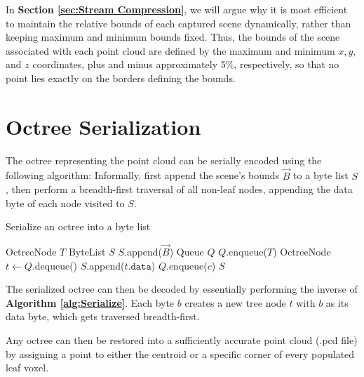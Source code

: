 \documentclass[twoside,twocolumn]{article}
\begin{document}
In \textbf{Section \ref{sec:Stream Compression}}, we will argue why it is most efficient to maintain the
relative bounds of each captured scene dynamically, rather than keeping maximum and minimum bounds fixed.
Thus, the bounds of the scene associated with each point cloud are defined by the maximum and minimum
$x, y,$ and $z$ coordinates, plus and minus approximately 5\%, respectively, so that no point lies
exactly on the borders defining the bounds.


\section{Octree Serialization} \label{sec:Octree Serialization}

The octree representing the point cloud can be serially encoded using the following algorithm:
Informally, first append the scene's bounds $\vec{B}$ to a byte list $S$, then perform
a breadth-first traversal of all non-leaf nodes, appending the data byte of each node visited to $S$.

\begin{algorithm}[h]
\small
\caption{Serialize an octree into a byte list}
\label{alg:Serialize}
\begin{algorithmic}[1]
 {OctreeNode $T$}
  \State ByteList $S$
  \State $S$.append($\vec{B}$)
  \State Queue $Q$
  \State $Q$.enqueue($T$)
    \State OctreeNode $t \gets Q$.dequeue()
      \State $S$.append($t.\mathtt{data}$)
        \State $Q$.enqueue($c$)
      \EndFor
    \EndIf
  \EndWhile
  \State \Return $S$
\EndProcedure
\Statex
\end{algorithmic}
  \vspace{-0.4cm}
\end{algorithm}

The serialized octree can then be decoded by essentially performing the inverse of
\textbf{Algorithm \ref{alg:Serialize}}. Each byte $b$ creates a new tree node $t$ with $b$ as its data
byte, which gets traversed breadth-first.

Any octree can then be restored into a sufficiently accurate point cloud (.pcd file) by assigning a point
to either the centroid or a specific corner of every populated leaf voxel.
\end{document}

